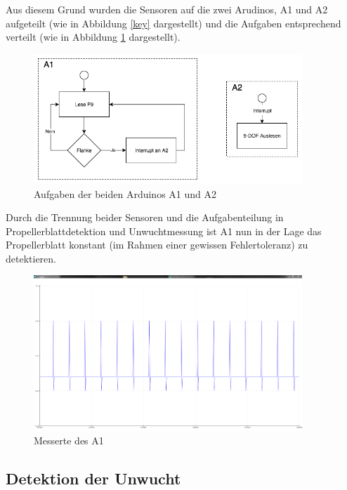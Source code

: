 Aus diesem Grund wurden die Sensoren auf die zwei Arudinos, \ac{A1} und \ac{A2} aufgeteilt (wie in Abbildung \ref{key}  dargestellt) und die Aufgaben entsprechend verteilt (wie in Abbildung \ref{fig:aufgaben-arduinos} dargestellt).
\begin{figure}[H]
	\centering
	\includegraphics[width=0.9\textwidth]{images/chapter/03/aufgaben-arduinos.png}
	\caption{Aufgaben der beiden Arduinos \ac{A1} und \ac{A2}}
	\label{fig:aufgaben-arduinos}
\end{figure}
Durch die Trennung beider Sensoren und die Aufgabenteilung in Propellerblattdetektion und Unwuchtmessung ist \ac{A1} nun in der Lage das Propellerblatt konstant (im Rahmen einer gewissen Fehlertoleranz) zu detektieren.
\begin{figure}[H]
	\centering
	\includegraphics[width=0.9\textwidth]{images/chapter/03/self_made_interrupt_a1.png}
	\caption{Messerte des \ac{A1}}
	\label{fig:self_made_interrupt_a1}
\end{figure}

\subsection{Detektion der Unwucht}
\label{subsec:detektion_der_unwucht}

